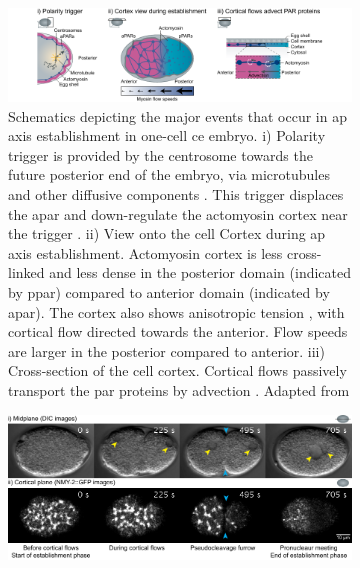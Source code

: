\begin{figure}

\centering
\begin{subfigure}{\textwidth}
    \centering
    \includegraphics[width=\textwidth]{Introduction/FigureApAxisEstablishment/ApAxisEstablishmentEvents.pdf}
    \caption{Schematics depicting the major events that occur in \acs{ap} axis establishment in one-cell \acs{ce} embryo. i) Polarity trigger is provided by the centrosome towards the future posterior end of the embryo, via microtubules and other diffusive components \citep{hoege2013principles}. This trigger displaces the \acs{apar} and down-regulate the actomyosin cortex near the trigger \citep{hoege2013principles,gross2019guiding}. ii) View onto the cell Cortex during \acs{ap} axis establishment. Actomyosin cortex is less cross-linked and less dense in the posterior domain (indicated by \acs{ppar}) compared to anterior domain (indicated by \acs{apar}). The cortex also shows anisotropic tension \citep{mayer2010anisotropies}, with cortical flow directed towards the anterior. Flow speeds are larger in the posterior compared to anterior. iii) Cross-section of the cell cortex. Cortical flows passively transport the \acs{par} proteins by advection \citep{goehring2011advectionpolarization}. Adapted from \cite{hoege2013principles}} 
    \label{subfig:apAxisEstablishmentMechanism-schematics}
\end{subfigure}
\hfill
\begin{subfigure}{\textwidth}
    \centering
    \includegraphics[width=\textwidth]{Introduction/FigureApAxisEstablishment/ApAxisEstablishmentCortexMicrograph.pdf}

\end{subfigure}
\end{figure}

